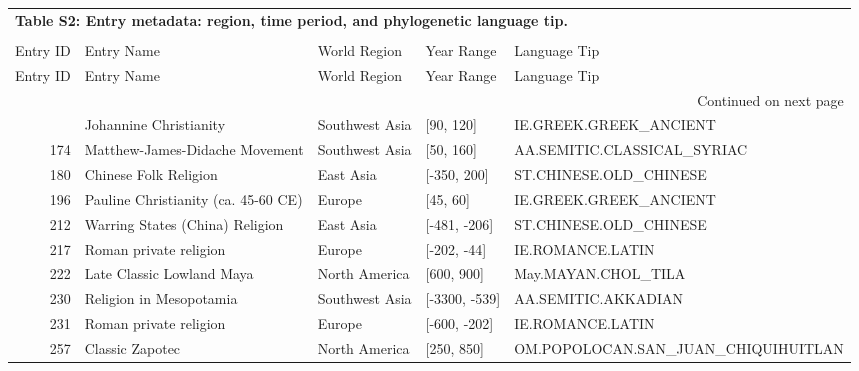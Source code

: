 {\footnotesize
\begin{longtable}{rp{3.5cm}llp{3.5cm}}
\multicolumn{5}{l}{\textbf{Table S2: Entry metadata: region, time period, and phylogenetic language tip.}} \\
\label{tab:si_metadata} \\
\toprule
Entry ID & Entry Name & World Region & Year Range & Language Tip \\
\midrule
\endfirsthead
\toprule
Entry ID & Entry Name & World Region & Year Range & Language Tip \\
\midrule
\endhead
\midrule
\multicolumn{5}{r}{Continued on next page} \\
\midrule
\endfoot
\bottomrule
\endlastfoot
173 & {\raggedright Johannine Christianity} & Southwest Asia & [90, 120] & {\raggedright IE.\allowbreak{}GREEK.\allowbreak{}GREEK\_\allowbreak{}ANCIENT} \\
174 & {\raggedright Matthew-James-Didache Movement} & Southwest Asia & [50, 160] & {\raggedright AA.\allowbreak{}SEMITIC.\allowbreak{}CLASSICAL\_\allowbreak{}SYRIAC} \\
180 & {\raggedright Chinese Folk Religion} & East Asia & [-350, 200] & {\raggedright ST.\allowbreak{}CHINESE.\allowbreak{}OLD\_\allowbreak{}CHINESE} \\
196 & {\raggedright Pauline Christianity (ca. 45-60 CE)} & Europe & [45, 60] & {\raggedright IE.\allowbreak{}GREEK.\allowbreak{}GREEK\_\allowbreak{}ANCIENT} \\
212 & {\raggedright Warring States (China) Religion} & East Asia & [-481, -206] & {\raggedright ST.\allowbreak{}CHINESE.\allowbreak{}OLD\_\allowbreak{}CHINESE} \\
217 & {\raggedright Roman private religion} & Europe & [-202, -44] & {\raggedright IE.\allowbreak{}ROMANCE.\allowbreak{}LATIN} \\
222 & {\raggedright Late Classic Lowland Maya} & North America & [600, 900] & {\raggedright May.\allowbreak{}MAYAN.\allowbreak{}CHOL\_\allowbreak{}TILA} \\
230 & {\raggedright Religion in Mesopotamia} & Southwest Asia & [-3300, -539] & {\raggedright AA.\allowbreak{}SEMITIC.\allowbreak{}AKKADIAN} \\
231 & {\raggedright Roman private religion} & Europe & [-600, -202] & {\raggedright IE.\allowbreak{}ROMANCE.\allowbreak{}LATIN} \\
257 & {\raggedright Classic Zapotec} & North America & [250, 850] & {\raggedright OM.\allowbreak{}POPOLOCAN.\allowbreak{}SAN\_\allowbreak{}JUAN\_\allowbreak{}CHIQUIHUITLAN} \\

\end{longtable}}
